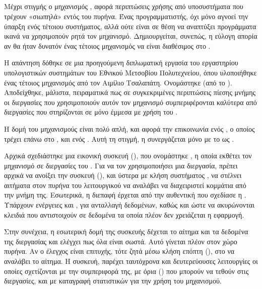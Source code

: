 
\subsection{}

Μέχρι στιγμής ο μηχανισμός , αφορά περιπτώσεις χρήσης από
υποσυστήματα που τρέχουν «σιωπηλά» εντός του πυρήνα. Ένας
προγραμματιστής, όχι μόνο αγνοεί την ύπαρξη ενός τέτοιου συστήματος,
αλλά ούτε είναι σε θέση να αναπτύξει προγράμματα ικανά να χρησιμοπούν ρητά τον μηχανισμό.
Δημιουργείται, συνεπώς, η
εύλογη απορία αν θα ήταν δυνατόν ένας τέτοιος μηχανισμός να
είναι διαθέσιμος στο .
\newline

Η απάντηση δόθηκε σε μια προηγούμενη διπλωματική εργασία του εργαστηρίου
υπολογιστικών συστημάτων του Εθνικού Μετσοβίου Πολυτεχνείου,
 όπου υλοποιήθηκε ένας τέτοιος μηχανισμός από τον Αιμίλιο Τσαλαπάτη.
Ονομάστηκε  (από το ). Αποδείχθηκε,
μάλιστα, πειραματικά πως σε συγκεκριμένες περιπτώσεις πίεσης
μνήμης οι διεργασίες που χρησιμοποιούν αυτόν τον μηχανισμό 
συμπεριφέρονται καλύτερα από διεργασίες που στηρίζονται σε
 μόνο έμμεσα με χρήση του \cite{Aimilios}\cite{paperAimiliou}.
\newline

Η δομή του μηχανισμούς είναι πολύ απλή, και αφορά την επικοινωνία ενός ,
ο οποίος τρέχει επάνω στο , και ενός . Αυτή τη
στιγμή, η  συνεργάζεται μόνο με το  ως .
\newline

Αρχικά σχεδιάστηκε μια εικονική συσκευή (), που
ονομάστηκε , η οποία εκθέτει τον μηχανισμό σε διεργασίες
του . Για να τον χρησιμοποιήσει μια διεργασία, πρέπει
αρχικά να ανοίξει την συσκευή (), και ύστερα με κλήση
συστήματος , να στέλνει αιτήματα στον πυρήνα του λειτουργικού
να αναλάβει να διαχειριστεί κομμάτια από την μνήμη της. Εσωτερικά,
η διεπαφή έρχεται από την αυθεντική  που σχεδίασε η . Υπάρχουν ενέργειες
 και , για ανταλλαγή δεδομένων, καθώς και 
ώστε να ακυρώνονται κλειδιά που αντιστοιχούν σε δεδομένα τα οποία πλέον δεν χρειάζεται
η εφαρμογή.
\newline

Στην συνέχεια, η εσωτερική δομή της συσκευής δέχεται το αίτημα
και τα δεδομένα της διεργασίας και ελέγχει πως όλα είναι σωστά.
Αυτό γίνεται πλέον στον χώρο πυρήνα. Αν ο έλεγχος είναι επιτυχής,
τότε ζητά μέσω κλήση επόπτη (), στο  να αναλάβει
το αίτημα. Η συσκευή, παρέχει ταυτόχρονα και δευτερεύουσες
λειτουργίες οι οποίες σχετίζονται με την συμπεριφορά της,
με όρια () που μπορούν να τεθούν στις διεργασίες, και με καταγραφή
στατιστικών για την χρήση του μηχανισμού.
\newline

